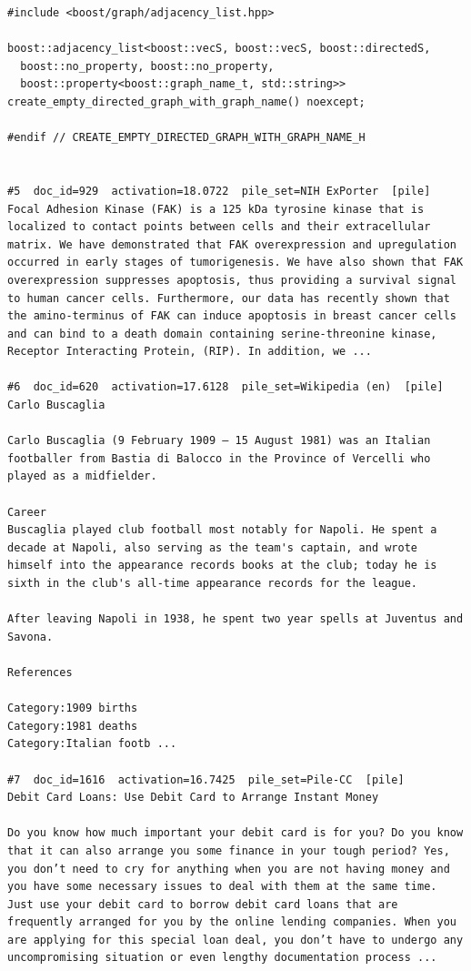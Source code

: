 \begin{verbatim}
#include <boost/graph/adjacency_list.hpp>

boost::adjacency_list<boost::vecS, boost::vecS, boost::directedS,
  boost::no_property, boost::no_property,
  boost::property<boost::graph_name_t, std::string>>
create_empty_directed_graph_with_graph_name() noexcept;

#endif // CREATE_EMPTY_DIRECTED_GRAPH_WITH_GRAPH_NAME_H


#5  doc_id=929  activation=18.0722  pile_set=NIH ExPorter  [pile]
Focal Adhesion Kinase (FAK) is a 125 kDa tyrosine kinase that is localized to contact points between cells and their extracellular matrix. We have demonstrated that FAK overexpression and upregulation occurred in early stages of tumorigenesis. We have also shown that FAK overexpression suppresses apoptosis, thus providing a survival signal to human cancer cells. Furthermore, our data has recently shown that the amino-terminus of FAK can induce apoptosis in breast cancer cells and can bind to a death domain containing serine-threonine kinase, Receptor Interacting Protein, (RIP). In addition, we ...

#6  doc_id=620  activation=17.6128  pile_set=Wikipedia (en)  [pile]
Carlo Buscaglia

Carlo Buscaglia (9 February 1909 – 15 August 1981) was an Italian footballer from Bastia di Balocco in the Province of Vercelli who played as a midfielder.

Career
Buscaglia played club football most notably for Napoli. He spent a decade at Napoli, also serving as the team's captain, and wrote himself into the appearance records books at the club; today he is sixth in the club's all-time appearance records for the league.

After leaving Napoli in 1938, he spent two year spells at Juventus and Savona.

References

Category:1909 births
Category:1981 deaths
Category:Italian footb ...

#7  doc_id=1616  activation=16.7425  pile_set=Pile-CC  [pile]
Debit Card Loans: Use Debit Card to Arrange Instant Money

Do you know how much important your debit card is for you? Do you know that it can also arrange you some finance in your tough period? Yes, you don’t need to cry for anything when you are not having money and you have some necessary issues to deal with them at the same time. Just use your debit card to borrow debit card loans that are frequently arranged for you by the online lending companies. When you are applying for this special loan deal, you don’t have to undergo any uncompromising situation or even lengthy documentation process ...


\end{verbatim}
